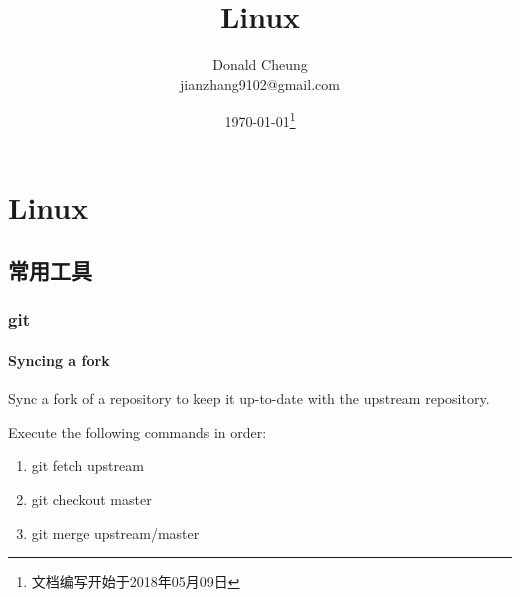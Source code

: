 \ifx\engineeringnotes\undefined
    \providecommand{\notesroot}{../..}
    \providecommand{\linuxroot}{.}

    \title{Linux}
    \author{Donald Cheung\\jianzhang9102@gmail.com}
    \date{\today\footnote{文档编写开始于2018年05月09日}}

    
\else
    \providecommand{\linuxroot}{\engineeringroot/Python}
\fi

\chapter{Linux}

\section{常用工具}
\subsection{git}

\subsubsection{Syncing a fork}
Sync a fork of a repository to keep it up-to-date with the upstream repository.

Execute the following commands in order:
\begin{enumerate}
    \item git fetch upstream
    \item git checkout master
    \item git merge upstream/master
\end{enumerate}


\ifx\engineeringnotes\undefined
    
\fi
